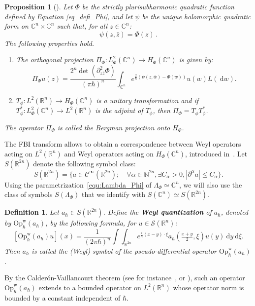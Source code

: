 \documentclass{article}
\newtheorem{prop}[theo]{Proposition}
\newtheorem{defi}[theo]{Definition}
\newcommand{\Op}{\mathrm{Op}}
\newcommand{\w}{\mathrm{w}}
\newcommand{\DD}{\:\!\mathrm{d}}
\newcommand{\Cinf}{\mathscr{C}^\infty}
\newcommand{\intint}{\int\!\!\!\!\int}
\newcommand{\RM}{\mathbb{R}}
\newcommand{\CM}{\mathbb{C}}
\newcommand{\h}{\hbar}
\begin{document}
\begin{prop}[{\cite[Formula~(1.12)]{sj-96}}] \label{prop_defi_Brg_projection}
  Let $ \Phi$ be the strictly plurisubharmonic quadratic function
  defined by Equation \eqref{eq_defi_Phi}, and let $\psi$ be the
  unique holomorphic quadratic form on $ \CM^n \times \CM^n$ such
  that, for all $z \in \CM^n$:
  \begin{equation}
    \psi(z, \bar{z}) = \Phi(z) \,.
    \label{equ:psi}  
  \end{equation}
  The following properties hold.
  \begin{enumerate}[label=\roman*)]
  \item The orthogonal projection
    $ \Pi_{\Phi}: L^2_{ \Phi}( \CM^n) \to H_{\Phi}( \CM^n)$ is given
    by:
    \begin{equation}
      \Pi_{ \Phi} u(z) = \dfrac{2^n \det ( \partial_{z\bar z}^2 \Phi )}{( \pi \hbar)^n} 
      \int_{ \CM^n} 
      e^{\frac{2}{\h}( \psi(z, \bar{w}) - \Phi(w))} u(w) L(\DD w) .
      \label{equ:quadratic-projection}
    \end{equation}
    
  \item $T_{ \phi}: L^2( \mathbb{R}^n) \to H_{ \Phi}( \CM^n)$ is a
    unitary transformation and if
    $T_{\phi}^*: L^2_{\Phi}( \CM^n) \to L^2( \mathbb{R}^n)$ is the
    adjoint of $T_{\phi}$, then $\Pi_{ \Phi} = T_{\phi} T_{\phi}^*$.
  \end{enumerate}
  The operator $ \Pi_{\Phi}$ is called the Bergman projection onto
  $H_{ \Phi}$.
\end{prop}

The FBI transform allows to obtain a correspondence between Weyl
operators acting on $L^2( \mathbb{R}^n)$ and Weyl operators acting on
$H_{\Phi}( \CM^n)$, introduced in~\cite{sj-96}.  Let
$S( \mathbb{R}^{2n})$ denote the following symbol class:
\[
S( \mathbb{R}^{2n}) = \lbrace a \in \Cinf( \mathbb{R}^{2n}); \quad
\forall \alpha \in \mathbb{N}^{2n}, \exists C_{ \alpha} > 0,
| \partial^{ \alpha} a | \leq C_{ \alpha} \rbrace.
\]
Using the parametrization~\eqref{equ:Lambda_Phi} of
$ \Lambda_{ \Phi} \simeq \CM^n$, we will also use the class of symbols
$S( \Lambda_{ \Phi})$ that we identify with
$S( \CM^n) \simeq S( \mathbb{R}^{2n})$.

\begin{defi}
  Let $a_{ \hbar} \in S( \mathbb{R}^{2n})$. Define the \textbf{Weyl
    quantization} of $a_{ \hbar}$, denoted by
  $ \Op^{\w}_\h(a_{ \hbar})$, by the following formula, for
  $u \in \mathscr{S}( \mathbb{R}^{n})$:
  \[
  \left[\Op^{\w}_\h(a_{ \hbar}) u \right] (x) = \dfrac{1}{(2 \pi
    \hbar)^n} \intint_{\mathbb{R}^{2n}} e^{\frac{i}{\h}(x-y) \cdot
    \xi} a_{ \hbar} \left( \tfrac{x+y}{2}, \xi \right) u(y)\DD y\DD
  \xi.
  \]
  Then $a_{ \hbar}$ is called the (Weyl) symbol of the
  pseudo-differential operator $ \Op^{\w}_\h(a_{ \hbar})$.
\end{defi}
By the Calderón-Vaillancourt theorem (see for instance~\cite[Theorem
7.11]{dimassi-sjostrand}, \cite[Theorem 2.8.1]{martinez-book} or
\cite[Theorem 4.23]{zworski-book-12}), such an operator
$ \Op^{\w}_\h(a_{ \hbar})$ extends to a bounded operator on
$L^2(\RM^n)$ whose operator norm is bounded by a constant independent
of $\h$.
\end{document}
